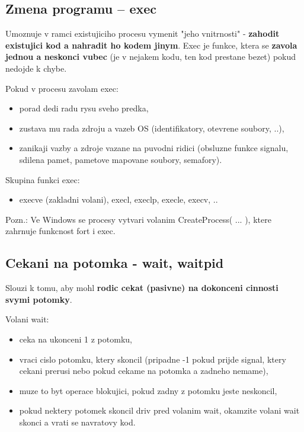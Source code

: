 \documentclass[a4paper, 11pt]{article}
\begin{document}
\subsection{Zmena programu -- exec}
Umoznuje v ramci existujiciho procesu vymenit "jeho vnitrnosti" - \textbf{zahodit existujici kod a nahradit ho kodem jinym}. Exec je funkce, ktera se \textbf{zavola jednou a neskonci vubec} (je v nejakem kodu, ten kod prestane bezet) pokud nedojde k chybe.

Pokud v procesu zavolam exec:
\begin{itemize}
    \item porad dedi radu rysu sveho predka,
    \item zustava mu rada zdroju a vazeb OS (identifikatory, otevrene soubory, ..),
    \item zanikaji vazby a zdroje vazane na puvodni ridici (obsluzne funkce signalu, sdilena pamet, pametove mapovane soubory, semafory).
\end{itemize}

Skupina funkci exec:
\begin{itemize}
    \item execve (zakladni volani), execl, execlp, execle, execv, ..
\end{itemize}

Pozn.: Ve Windows se procesy vytvari volanim CreateProcess( ... ), ktere zahrnuje funkcnost fort i exec. \\

\newpage

\subsection{Cekani na potomka - wait, waitpid}
Slouzi k tomu, aby mohl \textbf{rodic cekat (pasivne) na dokonceni cinnosti svymi potomky}.

Volani wait:
\begin{itemize}
    \item ceka na ukonceni 1 z potomku,
    \item vraci cislo potomku, ktery skoncil (pripadne -1 pokud prijde signal, ktery cekani prerusi nebo pokud cekame na potomka a zadneho nemame),
    \item muze to byt operace blokujici, pokud zadny z potomku jeste neskoncil, 
    \item pokud nektery potomek skoncil driv pred volanim wait, okamzite volani wait skonci a vrati se navratovy kod. \\
\end{itemize}
\end{document}
